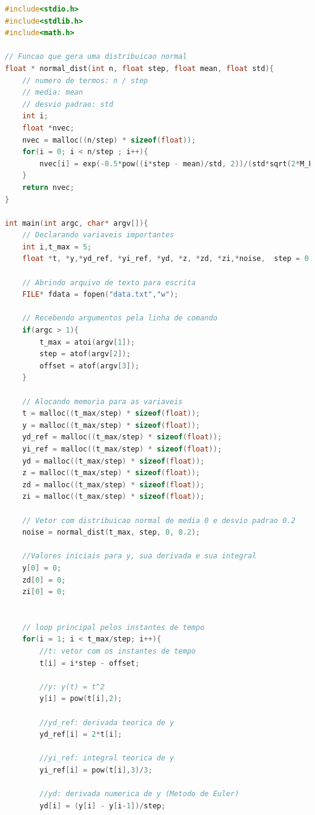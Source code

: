 \documentclass[
	12pt,				%
	openany,			%
	twoside,			%
	a4paper,			%
	english,			%
	french,				%
	spanish,			%
	brazil,				%
	]{abntex2}
\begin{document}
\begin{lstlisting}[language=C++,caption={Código em C para cálculo das derivadas e integrais},captionpos=t,label=lst:ccode]
#include<stdio.h>
#include<stdlib.h>
#include<math.h>

// Funcao que gera uma distribuicao normal
float * normal_dist(int n, float step, float mean, float std){
    // numero de termos: n / step 
    // media: mean
    // desvio padrao: std
    int i;
    float *nvec;
    nvec = malloc((n/step) * sizeof(float)); 
    for(i = 0; i < n/step ; i++){
        nvec[i] = exp(-0.5*pow((i*step - mean)/std, 2))/(std*sqrt(2*M_PI));
    }
    return nvec;
}

int main(int argc, char* argv[]){
    // Declarando variaveis importantes
    int i,t_max = 5;
    float *t, *y,*yd_ref, *yi_ref, *yd, *z, *zd, *zi,*noise,  step = 0.01, offset = 0;

    // Abrindo arquivo de texto para escrita
    FILE* fdata = fopen("data.txt","w");
    
    // Recebendo argumentos pela linha de comando
    if(argc > 1){
        t_max = atoi(argv[1]);
        step = atof(argv[2]);
        offset = atof(argv[3]);
    }
    
    // Alocando memoria para as variaveis
    t = malloc((t_max/step) * sizeof(float));
    y = malloc((t_max/step) * sizeof(float));
    yd_ref = malloc((t_max/step) * sizeof(float));
    yi_ref = malloc((t_max/step) * sizeof(float));
    yd = malloc((t_max/step) * sizeof(float));
    z = malloc((t_max/step) * sizeof(float));
    zd = malloc((t_max/step) * sizeof(float));
    zi = malloc((t_max/step) * sizeof(float));

    // Vetor com distribuicao normal de media 0 e desvio padrao 0.2
    noise = normal_dist(t_max, step, 0, 0.2);
    
    //Valores iniciais para y, sua derivada e sua integral 
    y[0] = 0;
    zd[0] = 0;
    zi[0] = 0;
    

    // loop principal pelos instantes de tempo
    for(i = 1; i < t_max/step; i++){
        //t: vetor com os instantes de tempo
        t[i] = i*step - offset;

        //y: y(t) = t^2
        y[i] = pow(t[i],2);

        //yd_ref: derivada teorica de y
        yd_ref[i] = 2*t[i];
        
        //yi_ref: integral teorica de y
        yi_ref[i] = pow(t[i],3)/3;

        //yd: derivada numerica de y (Metodo de Euler)
        yd[i] = (y[i] - y[i-1])/step;


\end{lstlisting}
\end{document}
